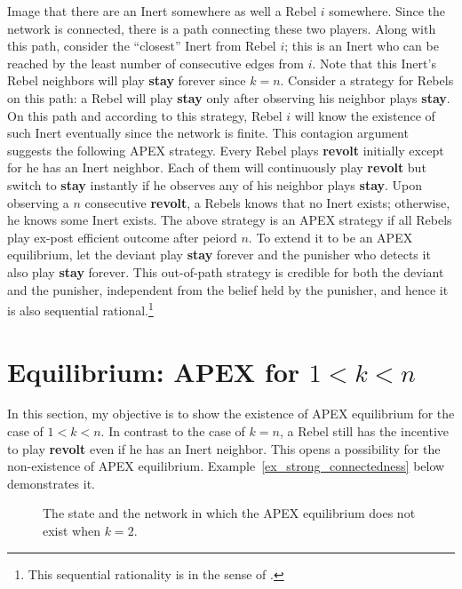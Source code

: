 \documentclass[12pt,letter]{article}
\theoremstyle{definition}
\theoremstyle{remark}
\theoremstyle{claim}
\begin{document}
Image that there are an Inert somewhere as well a Rebel $i$ somewhere. Since the network is connected, there is a path connecting these two players. Along with this path, consider the ``closest'' Inert from Rebel $i$; this is an Inert who can be reached by the least number of consecutive edges from $i$. Note that this Inert's Rebel neighbors will play \textbf{stay} forever since $k=n$. Consider a strategy for Rebels on this path: a Rebel will play \textbf{stay} only after observing his neighbor plays \textbf{stay}.  On this path and according to this  strategy, Rebel $i$ will know the existence of such Inert eventually since the network is finite. This contagion argument suggests the following APEX strategy. Every Rebel plays \textbf{revolt} initially except for he has an Inert neighbor. Each of them will continuously play \textbf{revolt} but switch to \textbf{stay} instantly if he observes any of his neighbor plays \textbf{stay}. Upon observing a $n$ consecutive \textbf{revolt}, a Rebels knows that no Inert exists; otherwise, he knows some Inert exists. The above strategy is an APEX strategy if all Rebels play ex-post efficient outcome after peiord $n$. To extend it to be an APEX equilibrium, let the deviant play \textbf{stay} forever and the punisher who detects it also play \textbf{stay} forever. This out-of-path strategy is credible for both the deviant and the punisher, independent from the belief held by the punisher, and hence it is also sequential rational.\footnote{This sequential rationality is in the sense of \citep{Krep_Wilson1982}.}




\section{Equilibrium: APEX for $1<k<n$}
\label{sec:equilibrium_2}

In this section, my objective is to show the existence of APEX equilibrium for the case of $1<k<n$. In contrast to the case of $k=n$, a Rebel still has the incentive to play \textbf{revolt} even if he has an Inert neighbor. This opens a possibility for the non-existence of APEX equilibrium. Example~\ref{ex_strong_connectedness} below demonstrates it.

\begin{figure}

\begin{center}
\end{center}

\caption{The state and the network in which the APEX equilibrium does not exist when $k=2$.}
\label{fig:strong_connectedness}
\end{figure}
\end{document}
